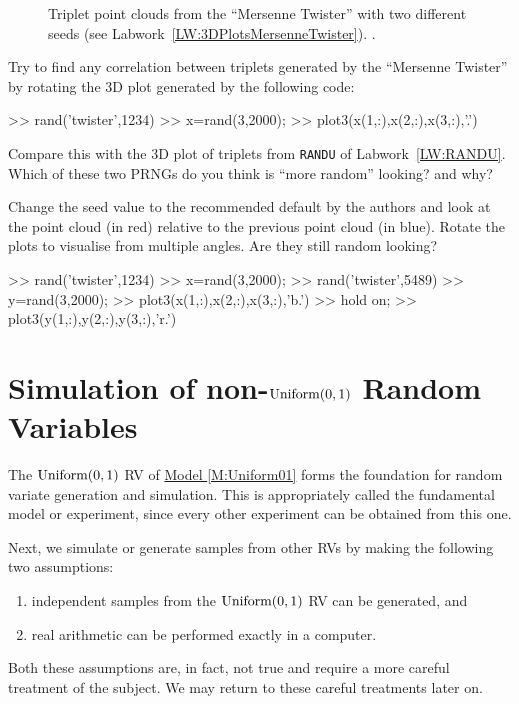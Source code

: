 \begin{figure}[htbp]
\caption{Triplet point clouds from the ``Mersenne Twister'' with two different seeds (see Labwork~\ref{LW:3DPlotsMersenneTwister}).
.\label{F:MersenneTwisterTwo3DPtclouds}}
\centering   {}
\end{figure}
\begin{labwork}\label{LW:3DPlotsMersenneTwister}
Try to find any correlation between triplets generated by the ``Mersenne Twister'' by rotating the 3D plot generated by the following code:
\begin{VrbM}
>> rand('twister',1234)
>> x=rand(3,2000); %
>> plot3(x(1,:),x(2,:),x(3,:),'.')
\end{VrbM}
Compare this with the 3D plot of triplets from {\tt RANDU} of Labwork~\ref{LW:RANDU}. Which of these two PRNGs do you think is ``more random'' looking? and why? 

Change the seed value to the recommended default by the authors and look at the point cloud (in red) relative to the previous point cloud (in blue).  Rotate the plots to visualise from multiple angles.  Are they still random looking?
\begin{VrbM}
>> rand('twister',1234)%
>> x=rand(3,2000); %
>> rand('twister',5489)%
>> y=rand(3,2000);%
>> plot3(x(1,:),x(2,:),x(3,:),'b.') %
>> hold on;
>> plot3(y(1,:),y(2,:),y(3,:),'r.') %
\end{VrbM}
\end{labwork}

\section{Simulation of non-$\mbox{{\rm Uniform}}(0,1)$ Random Variables}\label{S:nonUniformRVG}

The $\mbox{{\rm Uniform}}(0,1)$ RV of \hyperref[M:Uniform01]{Model \ref*{M:Uniform01}} forms the foundation for random variate generation and simulation.  This is appropriately called the fundamental model or experiment, since every other experiment can be obtained from this one.

Next, we simulate or generate samples from other RVs by making the following two assumptions:
\begin{enumerate}
\item independent samples from the $\mbox{{\rm Uniform}}(0,1)$ RV can be generated, and
\item real arithmetic can be performed exactly in a computer.
\end{enumerate}
Both these assumptions are, in fact, not true and require a more careful treatment of the subject.  We may return to these careful treatments later on.

